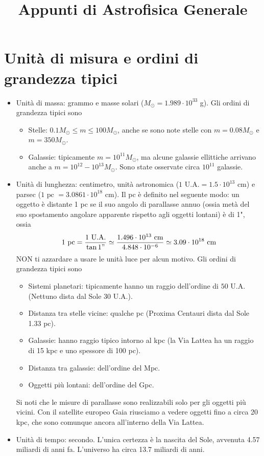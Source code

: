 \documentclass[a4paper,11pt]{article}
\title{Appunti di Astrofisica Generale}
\date{}
\newcommand{\s}{_\odot}
\theoremstyle{theorem}
\theoremstyle{definition}
\begin{document}
	\maketitle

	\section{Unità di misura e ordini di grandezza tipici}
	\begin{itemize}
		\item Unità di massa: grammo e masse solari ($M\s=1.989\cdot10^{33}$ g). Gli ordini di grandezza tipici sono
		\begin{itemize}
			\item Stelle: $0.1 M\s\leq m\leq100 M\s$, anche se sono note stelle con $m=0.08 M\s$ e $m=350 M\s$. 
			\item Galassie: tipicamente $m=10^{11}M\s$, ma alcune galassie ellittiche arrivano anche a $m=10^{12}-10^{13}M\s$. Sono state osservate circa $10^{11}$ galassie.
		\end{itemize}
		\item Unità di lunghezza: centimetro, unità astronomica ($1 \textrm{ U.A.}=1.5\cdot10^{13}$ cm) e parsec ($1 \textrm{ pc }=3.0861\cdot10^{18}$ cm). Il pc è definito nel seguente modo: un oggetto è distante 1 pc se il suo angolo di parallasse annuo (ossia metà del suo spostamento angolare apparente rispetto agli oggetti lontani) è di 1", ossia
		\[1\textrm{ pc}=\frac{1\textrm{ U.A.}}{\tan1"}\simeq\frac{1.496\cdot10^{13}\textrm{ cm}}{4.848\cdot10^{-6}}\simeq3.09\cdot10^{18}\textrm{ cm}\] NON ti azzardare a usare le unità luce per alcun motivo. Gli ordini di grandezza tipici sono
		\begin{itemize}
			\item Sistemi planetari: tipicamente hanno un raggio dell'ordine di $50$ U.A. (Nettuno dista dal Sole 30 U.A.).
			\item Distanza tra stelle vicine: qualche pc (Proxima Centauri dista dal Sole 1.33 pc).
			\item Galassie: hanno raggio tipico intorno al kpc (la Via Lattea ha un raggio di 15 kpc e uno spessore di 100 pc).
			\item Distanza tra galassie: dell'ordine del Mpc.
			\item Oggetti più lontani: dell'ordine del Gpc.
		\end{itemize}
		Si noti che le misure di parallasse sono realizzabili solo per gli oggetti più vicini. Con il satellite europeo Gaia riusciamo a vedere oggetti fino a circa 20 kpc, che sono comunque ancora all'interno della Via Lattea.
	\item Unità di tempo: secondo. L'unica certezza è la nascita del Sole, avvenuta 4.57 miliardi di anni fa. L'universo ha circa 13.7 miliardi di anni.
	\end{itemize}
\end{document}
